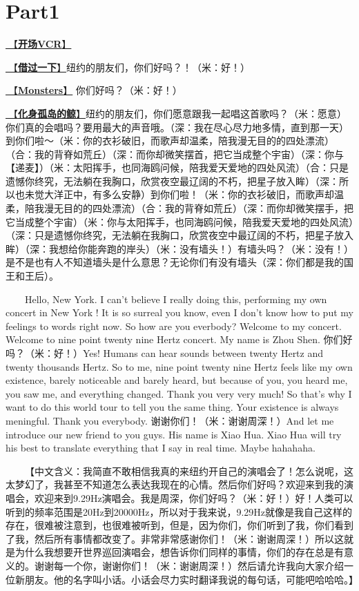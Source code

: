 \documentclass[]{ctexbook}
\begin{document}
\newpage

\section{Part1}\label{NewYork-20250309-part1}

\hyperref[opening-vcr]{🎥【\textbf{开场VCR}】}

\hyperref[I-will-go-my-way]{🎵【\textbf{借过一下}】}纽约的朋友们，你们好吗？！（米：好！）

\hyperref[Monsters]{🎵【\textbf{Monsters}】} 你们好吗？（米：好！）

\hyperref[hua-shen-gu-dao-de-jing]{🎵【\textbf{化身孤岛的鲸}】}纽约的朋友们，你们愿意跟我一起唱这首歌吗？（米：愿意）你们真的会唱吗？要用最大的声音哦。（深：我在尽心尽力地多情，直到那一天）到你们啦～（米：你的衣衫破旧，而歌声却温柔，陪我漫无目的的四处漂流）（合：我的背脊如荒丘）（深：而你却微笑摆首，把它当成整个宇宙）（深：你与【递麦】）（米：太阳挥手，也同海鸥问候，陪我爱天爱地的四处风流）（合：只是遗憾你终究，无法躺在我胸口，欣赏夜空最辽阔的不朽，把星子放入眸）（深：所以也未觉大洋正中，有多么安静）到你们啦！（米：你的衣衫破旧，而歌声却温柔，陪我漫无目的的四处漂流）（合：我的背脊如荒丘）（深：而你却微笑摆手，把它当成整个宇宙）（米：你与太阳挥手，也同海鸥问候，陪我爱天爱地的四处风流）（深：只是遗憾你终究，无法躺在我胸口，欣赏夜空中最辽阔的不朽，把星子放入眸）（深：我想给你能奔跑的岸头）（米：没有墙头！）有墙头吗？（米：没有！）是不是也有人不知道墙头是什么意思？无论你们有没有墙头（深：你们都是我的国王和王后）。

  Hello, New York. I can't believe I really doing this, performing my own concert in New York ! It is so surreal you know, even I don't know how to put my feelings to words right now. So how are you everbody? Welcome to my concert. Welcome to nine point twenty nine Hertz concert. My name is Zhou Shen. 你们好吗？（米：好！）Yes! Humans can hear sounds between twenty Hertz and twenty thousands Hertz. So to me, nine point twenty nine Hertz feels like my own existence, barely noticeable and barely heard, but because of you, you heard me, you saw me, and everything changed. Thank you very very much! So that's why I want to do this world tour to tell you the same thing. Your existence is always meningful. Thank you everybody. 谢谢你们！（米：谢谢周深！）And let me introduce our new friend to you guys. His name is Xiao Hua. Xiao Hua will try his best to translate everything that I say in real time. Maybe hahahaha.

  【中文含义：我简直不敢相信我真的来纽约开自己的演唱会了！怎么说呢，这太梦幻了，我甚至不知道怎么表达我现在的心情。然后你们好吗？欢迎来到我的演唱会，欢迎来到9.29Hz演唱会。我是周深，你们好吗？（米：好！）好！人类可以听到的频率范围是20Hz到20000Hz，所以对于我来说，9.29Hz就像是我自己这样的存在，很难被注意到，也很难被听到，但是，因为你们，你们听到了我，你们看到了我，然后所有事情都改变了。非常非常感谢你们！（米：谢谢周深！）所以这就是为什么我想要开世界巡回演唱会，想告诉你们同样的事情，你们的存在总是有意义的。谢谢每一个你，谢谢你们！（米：谢谢周深！）然后请允许我向大家介绍一位新朋友。他的名字叫小话。小话会尽力实时翻译我说的每句话，可能吧哈哈哈。】
\end{document}
